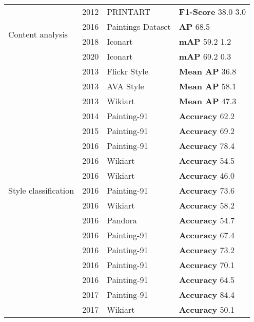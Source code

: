 \documentclass[acmlarge]{acmart}
\begin{document}
\begin{table}[tp]
\begin{tabular}{|p{3.2cm}|c|p{3.8cm}|p{3.9cm}|}
\multirow{4}{*}{Content analysis}  & 2012 & PRINTART &  \textbf{F1-Score} 38.0  3.0 \cite{carneiro2012artistic} \\ \cline{2-4} 
& 2016 & Paintings Dataset & \textbf{AP} 68.5 \cite{crowley2016art} \\ \cline{2-4}
& 2018 & Iconart & \textbf{mAP} 59.2  1.2 \cite{gonthier2018weakly} \\ \cline{2-4}
& 2020 & Iconart & \textbf{mAP} 69.2  0.3 \cite{gonthier2020multiple} \\ \hline
\multirow{24}{*}{Style classification} & 2013 & Flickr Style & \textbf{Mean AP} 36.8 \cite{karayev2013recognizing} \\ \cline{2-4}
& 2013 & AVA Style & \textbf{Mean AP}  58.1 \cite{karayev2013recognizing}  \\ \cline{2-4}
& 2013 & Wikiart & \textbf{Mean AP}  47.3 \cite{karayev2013recognizing}  \\ \cline{2-4}
& 2014 & Painting-91 & \textbf{Accuracy} 62.2 \cite{painting91} \\ \cline{2-4}
& 2015 & Painting-91 & \textbf{Accuracy} 69.2 \cite{peng2015cross} \\ \cline{2-4}
& 2016 & Painting-91 & \textbf{Accuracy} 78.4 \cite{anwer2016combining} \\ \cline{2-4}
& 2016 & Wikiart & \textbf{Accuracy} 54.5 \cite{tan2016ceci} \\ \cline{2-4}
& 2016 & Wikiart & \textbf{Accuracy} 46.0 \cite{saleh2015large} \\ \cline{2-4}
& 2016 & Painting-91 & \textbf{Accuracy} 73.6 \cite{chu2016deep} \\ \cline{2-4}
& 2016 & Wikiart & \textbf{Accuracy} 58.2 \cite{chu2016deep} \\ \cline{2-4}
& 2016 & Pandora & \textbf{Accuracy} 54.7 \cite{florea2016pandora} \\ \cline{2-4}
& 2016 & Painting-91 & \textbf{Accuracy} 67.4 \cite{puthenputhussery2016color} \\ \cline{2-4}
& 2016 & Painting-91 & \textbf{Accuracy} 73.2 \cite{puthenputhussery2016sparse} \\ \cline{2-4}
& 2016 & Painting-91 & \textbf{Accuracy} 70.1 \cite{peng2016toward} \\ \cline{2-4}
& 2016 & Painting-91 & \textbf{Accuracy} 64.5 \cite{banerji2016painting} \\ \cline{2-4}
& 2017 & Painting-91 & \textbf{Accuracy} 84.4 \cite{bianco2017large} \\ \cline{2-4}
& 2017 & Wikiart & \textbf{Accuracy} 50.1 \cite{huang2017fine} \\ \cline{2-4}

\end{tabular}
\end{table}
\end{document}
